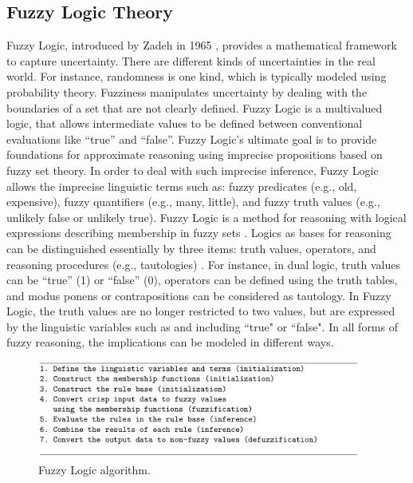 \documentclass[11pt]{article}
\begin{document}
\subsection{Fuzzy Logic Theory}

Fuzzy Logic, introduced by Zadeh in 1965 \cite{zadeh:fuzzy}, provides a
mathematical framework to capture uncertainty. There are different kinds of
uncertainties in the real world. For instance, randomness is one kind, which is
typically modeled using probability theory. Fuzziness manipulates uncertainty by
dealing with the boundaries of a set that are not clearly defined. Fuzzy Logic
is a multivalued logic, that allows intermediate values to be defined between
conventional evaluations like ``true'' and ``false''. Fuzzy Logic's ultimate
goal is to provide foundations for approximate reasoning using imprecise
propositions based on fuzzy set theory. In order to deal with such imprecise
inference, Fuzzy Logic allows the imprecise linguistic terms such as:
fuzzy predicates (e.g., old, expensive), fuzzy quantifiers (e.g., many, little),
and fuzzy truth values (e.g., unlikely false or unlikely true). Fuzzy Logic is a
method for reasoning with logical expressions describing membership in fuzzy
sets \cite{russell:ai-modern}. Logics as bases for reasoning can be
distinguished essentially by three items: truth values, operators, and reasoning
procedures (e.g., tautologies) \cite{zimmermann:fuzzy-sets}. For instance, in
dual logic, truth values can be ``true'' (1) or ``false'' (0), operators can be
defined using the truth tables, and modus ponens or contrapositions can be
considered as tautology. In Fuzzy Logic, the truth values are no longer
restricted to two values, but are expressed by the linguistic variables such as
and including ``true" or ``false". In all forms of fuzzy reasoning, the
implications can be modeled in different ways.

\begin{figure}[tbh]
  \center
  \includegraphics[width=0.95\textwidth]{figure/fuzzy-algorithm.png}
  \caption{Fuzzy Logic algorithm.}
  \label{fig:fuzzy-algorithm}
\end{figure}
\end{document}
